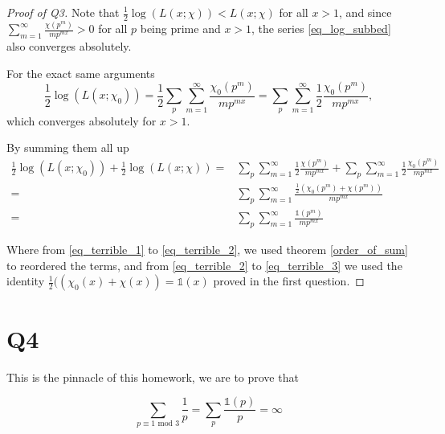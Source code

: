 \documentclass{article}
\theoremstyle{definition}
\theoremstyle{definition}
\theoremstyle{remark}
\renewcommand\mod{\text{ mod }}
\begin{document}
\begin{proof}[Proof of Q3]
Note that $ \frac{1}{2}\log(L(x; \chi)) < L(x; \chi)$ for all $x > 1$, and since $\sum_{m=1}^{\infty} \frac{\chi(p^m)}{mp^{mx}} > 0$ for all $p$ being prime and $x > 1$, the series \ref{eq_log_subbed} also converges absolutely.

For the exact same arguments
\begin{equation}
	\frac{1}{2}\log(L(x; \chi_0)) = 
	\frac{1}{2}\sum_{p} \sum_{m=1}^{\infty} \frac{\chi_0(p^m)}{mp^{mx}}=
	\sum_{p} \sum_{m=1}^{\infty} \frac{1}{2}\frac{\chi_0(p^m)}{mp^{mx}},
\end{equation}
which converges absolutely for $x > 1$.

By summing them all up
\begin{align}
		\label{eq_terrible_1}
		\frac{1}{2} \log(L(x; \chi_0)) + \frac{1}{2} \log(L(x; \chi)) =& 
	\sum_{p} \sum_{m=1}^{\infty} \frac{1}{2}\frac{\chi(p^m)}{mp^{mx}} +
		\sum_{p} \sum_{m=1}^{\infty} \frac{1}{2}\frac{\chi_0(p^m)}{mp^{mx}} \\ 
		\label{eq_terrible_2}
		=&
		\sum_{p} \sum_{m=1}^{\infty} \frac{\frac{1}{2}(\chi_0(p^m) + \chi(p^m))}{mp^{mx}} \\
		\label{eq_terrible_3}
		=&
		\sum_p \sum _{m=1}^{\infty} \frac{\mathbb{1}(p^m)}{m p^{mx}} 
	\end{align}

	Where from \ref{eq_terrible_1} to \ref{eq_terrible_2}, we used theorem \ref{order_of_sum} to reordered the terms, and from \ref{eq_terrible_2} to \ref{eq_terrible_3} we used the identity $\frac{1}{2}((\chi_0(x) + \chi(x)) = \mathbb{1}(x)$ proved in the first question.
\end{proof}

\section*{Q4}
This is the pinnacle of this homework, we are to prove that 

\begin{equation}
	\sum_{p \equiv 1 \mod 3} \frac{1}{p} = \sum_{p} \frac{\mathbb{1}(p)}{p} = \infty
\end{equation}
\end{document}
